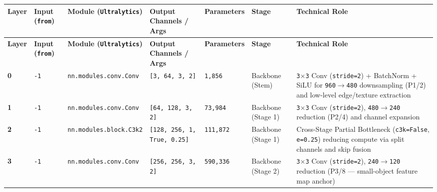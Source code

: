 \documentclass[10.5pt,a4paper]{article}
\begin{document}
\begin{footnotesize}
\setlength{\tabcolsep}{4pt}
\setlength{\LTleft}{0pt}\setlength{\LTright}{0pt}
\begin{longtable}{>{\raggedright\arraybackslash}p{} >{\raggedright\arraybackslash}p{} >{\raggedright\arraybackslash}p{} >{\raggedright\arraybackslash}p{} >{\raggedright\arraybackslash}p{} >{\raggedright\arraybackslash}p{} >{\raggedright\arraybackslash}p{}}
\toprule
\textbf{Layer} & \textbf{Input (\texttt{from})} & \textbf{Module (\texttt{Ultralytics})} & \textbf{Output Channels / Args} & \textbf{Parameters} & \textbf{Stage} & \textbf{Technical Role} \\
\midrule
\endfirsthead
\toprule
\textbf{Layer} & \textbf{Input (\texttt{from})} & \textbf{Module (\texttt{Ultralytics})} & \textbf{Output Channels / Args} & \textbf{Parameters} & \textbf{Stage} & \textbf{Technical Role} \\
\midrule
\endhead
\bottomrule
\endfoot
\textbf{0} & \texttt{-\allowbreak{}1} & \texttt{nn.\allowbreak{}modules.\allowbreak{}conv.\allowbreak{}Conv} & \texttt{[3,\allowbreak{} 64,\allowbreak{} 3,\allowbreak{} 2]} & \texttt{1,\allowbreak{}856} & Backbone (Stem) & \texttt{3$\times$3} Conv (\texttt{stride=2}) + BatchNorm + SiLU for \texttt{960$\rightarrow$480} downsampling (P1/2) and low-level edge/texture extraction \\
\textbf{1} & \texttt{-\allowbreak{}1} & \texttt{nn.\allowbreak{}modules.\allowbreak{}conv.\allowbreak{}Conv} & \texttt{[64,\allowbreak{} 128,\allowbreak{} 3,\allowbreak{} 2]} & \texttt{73,\allowbreak{}984} & Backbone (Stage 1) & \texttt{3$\times$3} Conv (\texttt{stride=2}), \texttt{480$\rightarrow$240} reduction (P2/4) and channel expansion \\
\textbf{2} & \texttt{-\allowbreak{}1} & \texttt{nn.\allowbreak{}modules.\allowbreak{}block.\allowbreak{}C3k2} & \texttt{[128,\allowbreak{} 256,\allowbreak{} 1,\allowbreak{} True,\allowbreak{} 0.\allowbreak{}25]} & \texttt{111,\allowbreak{}872} & Backbone (Stage 1) & Cross-Stage Partial Bottleneck (\texttt{c3k=False}, \texttt{e=0.\allowbreak{}25}) reducing compute via split channels and skip fusion \\
\textbf{3} & \texttt{-\allowbreak{}1} & \texttt{nn.\allowbreak{}modules.\allowbreak{}conv.\allowbreak{}Conv} & \texttt{[256,\allowbreak{} 256,\allowbreak{} 3,\allowbreak{} 2]} & \texttt{590,\allowbreak{}336} & Backbone (Stage 2) & \texttt{3$\times$3} Conv (\texttt{stride=2}), \texttt{240$\rightarrow$120} reduction (P3/8 --- small-object feature map anchor) \\

\end{longtable}
\end{footnotesize}
\end{document}
